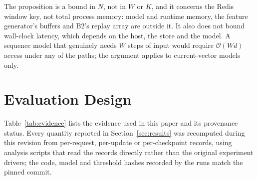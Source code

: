 \documentclass[a4paper,fleqn]{cas-dc}
\begin{document}
The proposition is a bound in $N$, not in $W$ or $K$, and it concerns the Redis window key, not total process memory: model and runtime memory, the feature generator's buffers and B2's replay array are outside it. It also does not bound wall-clock latency, which depends on the host, the store and the model. A sequence model that genuinely needs $W$ steps of input would require $\mathcal{O}(Wd)$ access under any of the paths; the argument applies to current-vector models only.

\section{Evaluation Design}
\label{sec:setup}
Table~\ref{tab:evidence} lists the evidence used in this paper and its provenance status. Every quantity reported in Section~\ref{sec:results} was recomputed during this revision from per-request, per-update or per-checkpoint records, using analysis scripts that read the records directly rather than the original experiment drivers; the code, model and threshold hashes recorded by the runs match the pinned commit.
\end{document}
